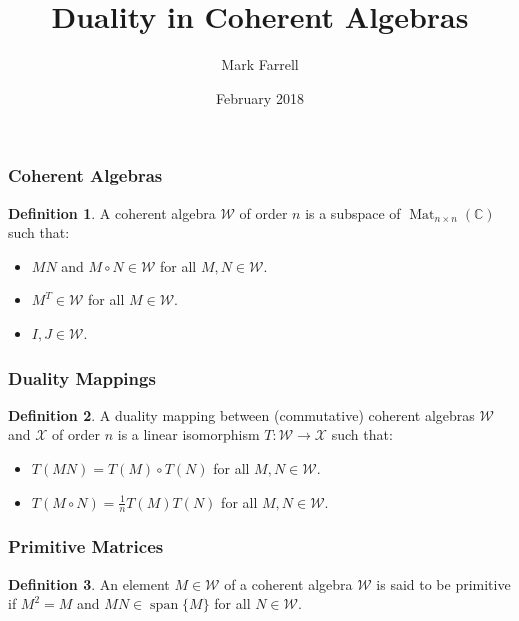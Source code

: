 \documentclass[notheorems]{beamer}
\title{Duality in Coherent Algebras}
\author{Mark Farrell}
\date{February 2018}
\theoremstyle{definition} %
\newtheorem{definition}{Definition}[section] %
\begin{document}
\begin{frame}
\titlepage
\end{frame}

\begin{frame}

\frametitle{Coherent Algebras}

	\begin{definition}

		  A coherent algebra $\mathcal{W}$ of order $n$ is a subspace of $\operatorname{Mat}_{n \times n}(\mathbb{C})$ such that:

		  \begin{itemize}
		  	\item $M N$ and $M \circ N \in \mathcal{W}$ for all $M, N \in \mathcal{W}$.
		  	\item $M^{T} \in \mathcal{W}$ for all $M \in \mathcal{W}$.
		  	\item $I, J \in \mathcal{W}$.
		  \end{itemize}

  \end{definition}

\end{frame}

\begin{frame}

\frametitle{Duality Mappings}

	\begin{definition}
		A duality mapping between (commutative) coherent algebras $\mathcal{W}$ and $\mathcal{X}$ of order $n$ is a linear isomorphism $T : \mathcal{W} \to \mathcal{X}$ such that:

			\begin{itemize}
		  		\item $T(M N) = T(M) \circ T(N) $ for all $M, N \in \mathcal{W}$.
		  		\item $T (M \circ N) = \frac{1}{n} T(M) T(N)$ for all $M, N \in \mathcal{W}$.
			\end{itemize}

  	\end{definition}

\end{frame}

\begin{frame}

\frametitle{Primitive Matrices}

	\begin{definition}
		An element $M \in \mathcal{W}$ of a coherent algebra $\mathcal{W}$ is said to be primitive if $M^{2} = M$ and $M N \in \operatorname{span} \{ M \}$ for all $N \in \mathcal{W}$.
	\end{definition}

\end{frame}
\end{document}
